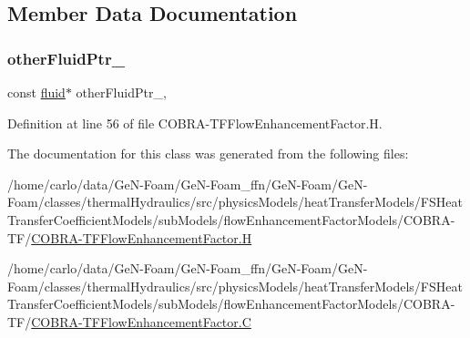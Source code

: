 \subsection{Member Data Documentation}
\mbox{\label{classFoam_1_1flowEnhancementFactorModels_1_1COBRA__TF_a4615ddb7d592b36a28f7812ea1e824f7}} 
\subsubsection{\texorpdfstring{other\+Fluid\+Ptr\+\_\+}{otherFluidPtr\_}}
{\footnotesize\ttfamily const \hyperlink{classFoam_1_1fluid}{fluid}$\ast$ other\+Fluid\+Ptr\+\_\+\hspace{0.3cm}{\ttfamily [mutable]}, {\ttfamily [protected]}}



Definition at line 56 of file C\+O\+B\+R\+A-\/\+T\+F\+Flow\+Enhancement\+Factor.\+H.



The documentation for this class was generated from the following files\+:\begin{DoxyCompactItemize}
\item 
/home/carlo/data/\+Ge\+N-\/\+Foam/\+Ge\+N-\/\+Foam\+\_\+ffn/\+Ge\+N-\/\+Foam/\+Ge\+N-\/\+Foam/classes/thermal\+Hydraulics/src/physics\+Models/heat\+Transfer\+Models/\+F\+S\+Heat\+Transfer\+Coefficient\+Models/sub\+Models/flow\+Enhancement\+Factor\+Models/\+C\+O\+B\+R\+A-\/\+T\+F/\hyperlink{COBRA-TFFlowEnhancementFactor_8H}{C\+O\+B\+R\+A-\/\+T\+F\+Flow\+Enhancement\+Factor.\+H}\item 
/home/carlo/data/\+Ge\+N-\/\+Foam/\+Ge\+N-\/\+Foam\+\_\+ffn/\+Ge\+N-\/\+Foam/\+Ge\+N-\/\+Foam/classes/thermal\+Hydraulics/src/physics\+Models/heat\+Transfer\+Models/\+F\+S\+Heat\+Transfer\+Coefficient\+Models/sub\+Models/flow\+Enhancement\+Factor\+Models/\+C\+O\+B\+R\+A-\/\+T\+F/\hyperlink{COBRA-TFFlowEnhancementFactor_8C}{C\+O\+B\+R\+A-\/\+T\+F\+Flow\+Enhancement\+Factor.\+C}\end{DoxyCompactItemize}
